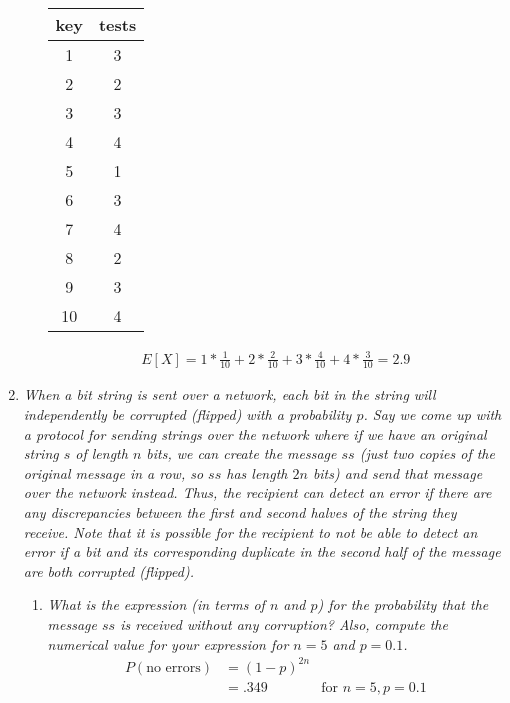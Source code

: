 \documentclass{article} %
\begin{document}
\begin{enumerate}
\begin{enumerate}
		\begin{center}
		\begin{tabular}{|c|c|}
		\hline
		key & tests\\
		\hline
		1 & 3\\
		\hline
		2 & 2\\
		\hline
		3 & 3\\
		\hline
		4 & 4\\
		\hline
		5 & 1\\
		\hline
		6 & 3\\
		\hline
		7 & 4\\
		\hline
		8 & 2\\
		\hline
		9 & 3\\
		\hline
		10 & 4\\
		\hline
		\end{tabular}
		\end{center}
		
		\begin{align*}
		E[X] = 1 * \frac{1}{10} + 2 * \frac{2}{10} + 3 * \frac{4}{10} + 4 * \frac{3}{10} = 2.9
		\end{align*}
	
	\end{enumerate}
	
	\item \textit{When a bit string is sent over a network, each bit in the string will independently be corrupted (flipped) with a probability $p$. Say we come up with a protocol for sending strings over the network where if we have an original string $s$ of length $n$ bits, we can create the message $ss$ (just two copies of the original message in a row, so $ss$ has length $2n$ bits) and send that message over the network instead. Thus, the recipient can detect an error if there are any discrepancies between the first and second halves of the string they receive. Note that it is possible for the recipient to not be able to detect an error if a bit and its corresponding duplicate in the second half of the message are both corrupted (flipped).}
	\begin{enumerate}
		\item \textit{What is the expression (in terms of $n$ and $p$) for the probability that the message $ss$ is received without any corruption? Also, compute the numerical value for your expression for $n = 5$ and $p = 0.1$.}
		\begin{align*}
		P(\text{no errors}) &= (1 - p)^{2n}\\
		&= .349 &\text{for } n = 5, p = 0.1
		\end{align*}
		

\end{enumerate}
\end{enumerate}
\end{document}
